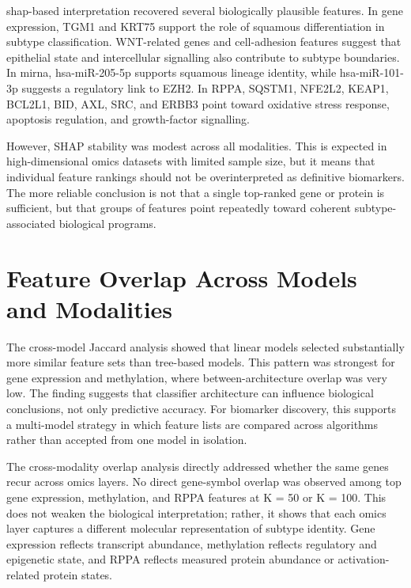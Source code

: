 \gls{shap}-based interpretation recovered several biologically plausible features. In gene expression, TGM1 and KRT75 support the role of squamous differentiation in subtype classification. WNT-related genes and cell-adhesion features suggest that epithelial state and intercellular signalling also contribute to subtype boundaries. In \gls{mirna}, hsa-miR-205-5p supports squamous lineage identity, while hsa-miR-101-3p suggests a regulatory link to EZH2. In RPPA, SQSTM1, NFE2L2, KEAP1, BCL2L1, BID, AXL, SRC, and ERBB3 point toward oxidative stress response, apoptosis regulation, and growth-factor signalling.

However, SHAP stability was modest across all modalities. This is expected in high-dimensional omics datasets with limited sample size, but it means that individual feature rankings should not be overinterpreted as definitive biomarkers. The more reliable conclusion is not that a single top-ranked gene or protein is sufficient, but that groups of features point repeatedly toward coherent subtype-associated biological programs.

\section{Feature Overlap Across Models and Modalities}

The cross-model Jaccard analysis showed that linear models selected substantially more similar feature sets than tree-based models. This pattern was strongest for gene expression and methylation, where between-architecture overlap was very low. The finding suggests that classifier architecture can influence biological conclusions, not only predictive accuracy. For biomarker discovery, this supports a multi-model strategy in which feature lists are compared across algorithms rather than accepted from one model in isolation.

The cross-modality overlap analysis directly addressed whether the same genes recur across omics layers. No direct gene-symbol overlap was observed among top gene expression, methylation, and RPPA features at K = 50 or K = 100. This does not weaken the biological interpretation; rather, it shows that each omics layer captures a different molecular representation of subtype identity. Gene expression reflects transcript abundance, methylation reflects regulatory and epigenetic state, and RPPA reflects measured protein abundance or activation-related protein states.

